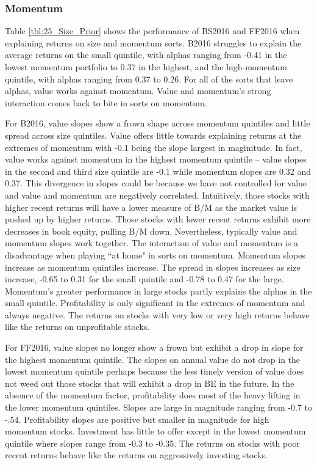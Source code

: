 
\subsubsection{Momentum}


Table \ref{tbl:25_Size_Prior} shows the performance of BS2016 and FF2016 when explaining
returns on size and momentum sorts. B2016 struggles to explain the average returns on the
small quintile, with alphas ranging from -0.41 in the lowest momentum portfolio to 0.37 in
the highest, and the high-momentum quintile, with alphas ranging from 0.37 to 0.26. For
all of the sorts that leave alphas, value works against momentum. Value and momentum's
strong interaction comes back to bite in sorts on momentum.

For B2016, value slopes show a frown shape across momentum quintiles and little spread
across size quintiles. Value offers little towards explaining returns at the extremes of
momentum with -0.1 being the slope largest in maginitude. In fact, value works against
momentum in the highest momentum quintile -- value slopes in the second and third size
quintile are -0.1 while momentum slopes are 0.32 and 0.37. This divergence in slopes could
be because we have not controlled for value and value and momentum are negatively
correlated. Intuitively, those stocks with higher recent returns will have a lower measure
of B/M as the market value is pushed up by higher returns. Those stocks with lower recent
returns exhibit more decreases in book equity, pulling B/M down. Nevertheless, typically
value and momentum slopes work together. The interaction of value and momentum is a
disadvantage when playing ``at home" in sorts on momentum. Momentum slopes increase as
momentum quintiles increase. The spread in slopes increases as size increase, -0.65 to
0.31 for the small quintile and -0.78 to 0.47 for the large. Momentum's greater
performance in large stocks partly explains the alphas in the small quintile.
Profitability is only significant in the extremes of momentum and always negative. The
returns on stocks with very low or very high returns behave like the returns on
unprofitable stocks.

For FF2016, value slopes no longer show a frown but exhibit a drop in slope for the
highest momentum quintile. The slopes on annual value do not drop in the lowest momentum
quintile perhaps because the less timely version of value does not weed out those stocks
that will exhibit a drop in BE in the future. In the absence of the momentum factor,
profitability does most of the heavy lifting in the lower momentum quintiles. Slopes are
large in magnitude ranging from -0.7 to -.54. Profitability slopes are positive but
smaller in magnitude for high momentum stocks. Investment has little to offer except in
the lowest momentum quintile where slopes range from -0.3 to -0.35. The returns on stocks
with poor recent returns behave like the returns on aggressively investing stocks.

